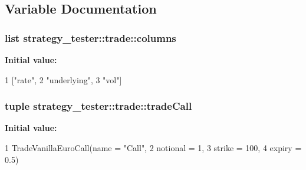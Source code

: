 \subsection{\-Variable \-Documentation}
\hypertarget{namespacestrategy__tester_1_1trade_a7df6fb417ad96509634649a66f05c2c3}{
\subsubsection[{columns}]{\setlength{\rightskip}{0pt plus 5cm}list strategy\-\_\-tester\-::trade\-::columns}}\label{namespacestrategy__tester_1_1trade_a7df6fb417ad96509634649a66f05c2c3}
{\bfseries \-Initial value\-:}
\begin{DoxyCode}
1 ["rate",
2                "underlying",
3                "vol"]
\end{DoxyCode}
\hypertarget{namespacestrategy__tester_1_1trade_a807e7353f8c066d05b145f4a5f762572}{
\subsubsection[{trade\-Call}]{\setlength{\rightskip}{0pt plus 5cm}tuple strategy\-\_\-tester\-::trade\-::trade\-Call}}\label{namespacestrategy__tester_1_1trade_a807e7353f8c066d05b145f4a5f762572}
{\bfseries \-Initial value\-:}
\begin{DoxyCode}
1 TradeVanillaEuroCall(name = "Call",
2                                         notional = 1,
3                                         strike = 100,
4                                         expiry = 0.5)
\end{DoxyCode}
